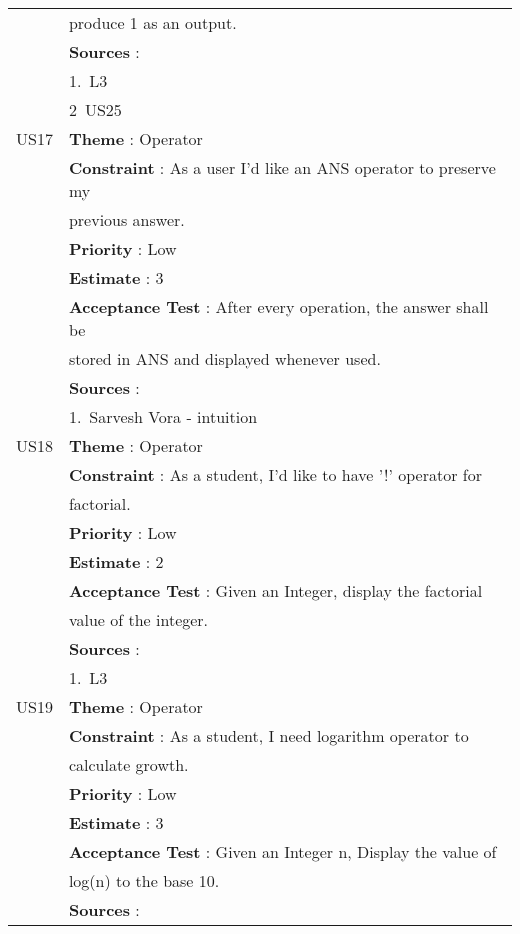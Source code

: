 \documentclass{article}
\begin{document}
\begin{longtable}{|| c || l ||}
         & produce 1 as an output.\\
         & \textbf{Sources} : \\
         & 1.~L3 \\
         & 2~US25 \\
         \hline
         \newpage
         \hline
         US17 & \textbf{Theme} : Operator \\
         & \textbf{Constraint} : As a user I'd like an ANS operator to preserve my \\
         & previous answer.\\
         & \textbf{Priority} : Low \\
         & \textbf{Estimate} : 3 \\
         & \textbf{Acceptance Test} : After every operation, the answer shall be \\
         & stored in ANS and displayed whenever used.\\
         & \textbf{Sources} : \\
         & 1.~Sarvesh Vora - intuition \\
         \hline
         US18 & \textbf{Theme} : Operator \\
         & \textbf{Constraint} : As a student, I'd like to have '!' operator for \\
         & factorial.\\
         & \textbf{Priority} : Low \\
         & \textbf{Estimate} : 2 \\
         & \textbf{Acceptance Test} : Given an Integer, display the factorial \\
         & value of the integer.\\
         & \textbf{Sources} : \\
         & 1.~L3 \\
         \hline
         US19 & \textbf{Theme} : Operator \\
         & \textbf{Constraint} : As a student, I need logarithm operator to \\
         & calculate growth.\\
         & \textbf{Priority} : Low \\
         & \textbf{Estimate} : 3 \\
         & \textbf{Acceptance Test} : Given an Integer n, Display the value of\\
         & log(n) to the base 10.\\
         & \textbf{Sources} : \\

\end{longtable}
\end{document}
